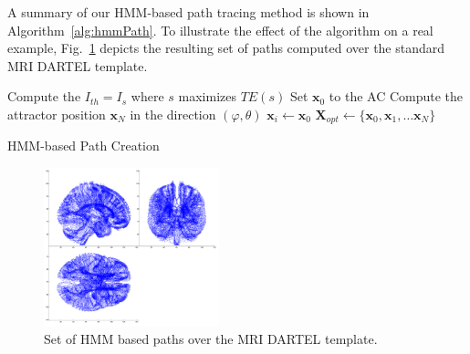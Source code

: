 A summary of our \ac{HMM}-based path tracing method is shown in Algorithm~\ref{alg:hmmPath}. To illustrate the effect of the algorithm on a real example, Fig.~\ref{fig:cuts} depicts the resulting set of paths computed over the standard MRI DARTEL template. 

\begin{algorithm*}
	\BlankLine
	Compute the $I_{th} = I_s$ where $s$ maximizes $TE(s)$\;
	Set $\mathbf{x}_0$ to the AC\;
	Compute the attractor position $\mathbf{x}_N$ in the direction $(\varphi, \theta)$\;
	$\mathbf{x}_i \leftarrow \mathbf{x}_0$\;
	$\mathbf{X}_{opt}\leftarrow \{\mathbf{x}_0, \mathbf{x}_1, \dots \mathbf{x}_N\}$\; 
	
	\caption[\acs{HMM}-based Path Creation]{\ac{HMM}-based Path Creation}\label{alg:hmmPath}
\end{algorithm*}\DecMargin{1em}


\begin{figure}
	\begin{center}
		\includegraphics[width=2in]{Graphics/ch6/cuts}
		\caption[Set of \acs{HMM} based paths over the MRI DARTEL template.]{Set of \ac{HMM} based paths over the MRI DARTEL template.}
		\label{fig:cuts}
	\end{center}
\end{figure}


